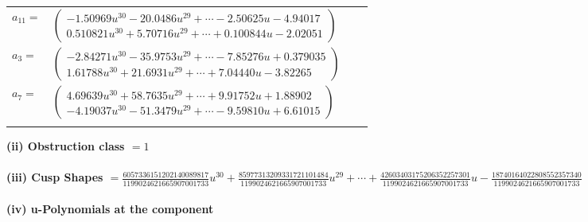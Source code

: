 \documentclass[1p]{elsarticle_modified}
\theoremstyle{definition}
\begin{document}
\begin{tabular}{m{7pt} m{180pt} m{7pt} m{180pt} }
\flushright $a_{11}=$&$\begin{pmatrix}-1.50969 u^{30}-20.0486 u^{29}+\cdots-2.50625 u-4.94017\\0.510821 u^{30}+5.70716 u^{29}+\cdots+0.100844 u-2.02051\end{pmatrix}$ \\
\flushright $a_{3}=$&$\begin{pmatrix}-2.84271 u^{30}-35.9753 u^{29}+\cdots-7.85276 u+0.379035\\1.61788 u^{30}+21.6931 u^{29}+\cdots+7.04440 u-3.82265\end{pmatrix}$ \\
\flushright $a_{7}=$&$\begin{pmatrix}4.69639 u^{30}+58.7635 u^{29}+\cdots+9.91752 u+1.88902\\-4.19037 u^{30}-51.3479 u^{29}+\cdots-9.59810 u+6.61015\end{pmatrix}$\\&\end{tabular}
\flushleft \textbf{(ii) Obstruction class $= 1$}\\~\\
\flushleft \textbf{(iii) Cusp Shapes $= \frac{6057336151202140089817}{1199024621665907001733} u^{30}+\frac{85977313209331721101484}{1199024621665907001733} u^{29}+\cdots+\frac{42603403175206352257301}{1199024621665907001733} u-\frac{18740164022808552357340}{1199024621665907001733}$}\\~\\
\newpage\renewcommand{\arraystretch}{1}
\flushleft \textbf{(iv) u-Polynomials at the component}\newline \\
\end{document}
